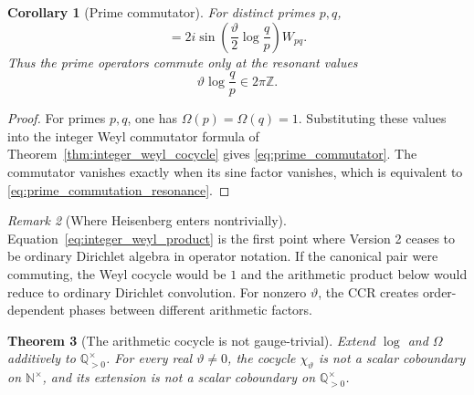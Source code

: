 \documentclass[11pt]{amsart}
\numberwithin{equation}{section}
\theoremstyle{plain}
\newtheorem{theorem}{Theorem}[section]
\newtheorem{corollary}[theorem]{Corollary}
\theoremstyle{definition}
\theoremstyle{remark}
\newtheorem{remark}[theorem]{Remark}
\begin{document}
\begin{corollary}[Prime commutator]
\label{cor:prime_commutator}
For distinct primes $p,q$,
\begin{equation}
[W_p,W_q]
=
2i\sin\!\left(\frac{\vartheta}{2}\log\frac{q}{p}\right)W_{pq}.
\label{eq:prime_commutator}
\end{equation}
Thus the prime operators commute only at the resonant values
\begin{equation}
\vartheta\log\frac{q}{p}\in2\pi\mathbb Z.
\label{eq:prime_commutation_resonance}
\end{equation}
\end{corollary}

\begin{proof}
For primes \(p,q\), one has \(\Omega(p)=\Omega(q)=1\).  Substituting these
values into the integer Weyl commutator formula of
Theorem~\ref{thm:integer_weyl_cocycle} gives
\eqref{eq:prime_commutator}.  The commutator vanishes exactly when its sine
factor vanishes, which is equivalent to
\eqref{eq:prime_commutation_resonance}.
\end{proof}

\begin{remark}[Where Heisenberg enters nontrivially]
\label{rem:where_heisenberg_enters}
Equation~\eqref{eq:integer_weyl_product} is the first point where Version 2
ceases to be ordinary Dirichlet algebra in operator notation.  If the
canonical pair were commuting, the Weyl cocycle would be $1$ and the
arithmetic product below would reduce to ordinary Dirichlet convolution.
For nonzero $\vartheta$, the CCR creates order-dependent phases between
different arithmetic factors.
\end{remark}

\begin{theorem}[The arithmetic cocycle is not gauge-trivial]
\label{thm:cocycle_nontrivial}
Extend \(\log\) and \(\Omega\) additively to
\(\mathbb Q_{>0}^{\times}\).  For every real \(\vartheta\ne0\), the
cocycle \(\chi_\vartheta\) is not a scalar coboundary on
\(\mathbb N^{\times}\), and its extension is not a scalar coboundary on
\(\mathbb Q_{>0}^{\times}\).
\end{theorem}
\end{document}
